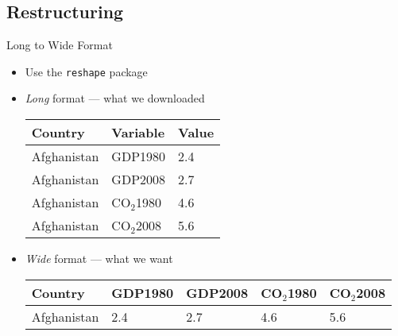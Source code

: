 \documentclass{beamer}
\begin{document}
\subsection{Restructuring}
\begin{frame}{Long to Wide Format}
\begin{itemize}
  \item Use the {\tt reshape} package
    \item \emph{Long} format --- what we downloaded \\
      \begin{table}
        \begin{tabular}{ | l | l | l | } \hline
          Country& Variable& Value \\ \hline
          Afghanistan& GDP1980& 2.4   \\ \hline
          Afghanistan& GDP2008  & 2.7   \\ \hline
          Afghanistan& CO$_2$1980  & 4.6   \\ \hline
          Afghanistan& CO$_2$2008  & 5.6   \\ \hline
          \end{tabular}
        \end{table}
      
      \item \emph{Wide} format --- what we want \\
        \begin{table}
          \begin{tabular}{| l || l | l | l | l |} \hline
            Country& GDP1980& GDP2008& CO$_2$1980& CO$_2$2008 \\ \hline
            Afghanistan& 2.4& 2.7& 4.6& 5.6 \\ \hline
            \end{tabular}
          \end{table}
\end{itemize}
\end{frame}
\end{document}
